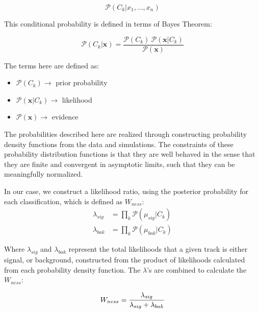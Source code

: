 \begin{equation}
	\label{eq:cond_probabilty}
  \mathcal{P}(C_k \vert x_1, \dots, x_n)
\end{equation}

This conditional probability is defined in terms of Bayes Theorem:

\begin{equation}
	\label{eq:bayes_theorm}
  \mathcal{P}(C_k \vert \mathbf{x}) = \frac{\mathcal{P}(C_k) \
  \mathcal{P}(\mathbf{x} \vert C_k)}{\mathcal{P}(\mathbf{x})}
\end{equation}

The terms here are defined as:
\begin{itemize}
  \item $\mathcal{P}(C_k)\rightarrow$ prior probability
	\item $\mathcal{P}(\mathbf{x} \vert C_k)\rightarrow$ likelihood
	\item $\mathcal{P}(\mathbf{x})\rightarrow$ evidence
\end{itemize}

The probabilities described here are realized through constructing probability
density functions from the data and simulations. The constraints of these
probability distribution functions is that they are well behaved in the sense
that they are finite and convergent in asymptotic limits, such that they can be
meaningfully normalized.

In our case, we construct a likelihood ratio, using the posterior probability
for each classification, which is defined as $W_{ness}$:
\begin{align*}
  \lambda_{sig} &= \prod_{k}\mathcal{P}(\mu_{sig}\vert C_k)\\
  \lambda_{bak} &= \prod_{k}\mathcal{P}(\mu_{bak}\vert C_k)
\end{align*}

Where $\lambda_{sig}$ and $\lambda_{bak}$ represent the total likelihoods that a
given track is either signal, or background, constructed from the product of
likelihoods calculated from each probability density function. The $\lambda$'s
are combined to calculate the $W_{ness}$:

\begin{equation}
  W_{ness} = { 
    {\lambda_{sig}}
    \over 
    {\lambda_{sig}+\lambda_{bak}} 
  }
\end{equation}


